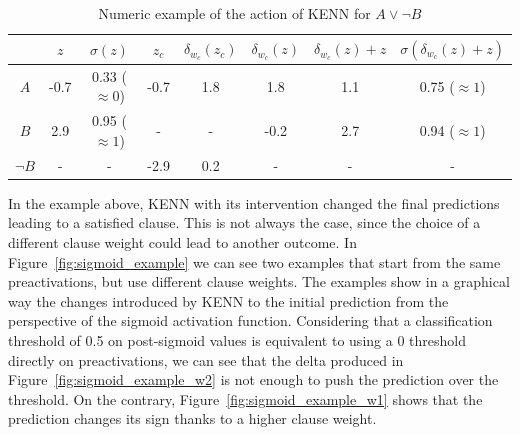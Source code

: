 \begin{table}[h]
\centering
\caption{Numeric example of the action of KENN for $ A \vee \neg B $}
\label{tab:example_tbf_values}
\begin{tabular}{c|c|c|c|c|c|c|c|}
\cline{2-8}
                                 & $ z $ & $ \sigma (z) $       & $ z_{c} $ & $ \delta _{w_{c}}(z_{c}) $ & $ \delta _{w_{c}}(z) $ & $ \delta _{w_{c}}(z) + z $ & $ \sigma (\delta _{w_{c}}(z)+ z)$ \\ \hline
\multicolumn{1}{|c|}{$ A $}      & -0.7  & 0.33 ($ \approx 0 $) & -0.7      & 1.8                        & 1.8                    & 1.1                        & 0.75 ($ \approx 1 $)              \\ \hline
\multicolumn{1}{|c|}{$ B $}      & 2.9   & 0.95 ($ \approx 1 $) & -         & -                          & -0.2                   & 2.7                        & 0.94 ($ \approx 1 $)              \\ \hline
\multicolumn{1}{|c|}{$ \neg B $} & -     & -                    & -2.9      & 0.2                        & -                      & -                          & -                                 \\ \hline
\end{tabular}
\end{table}


In the example above, KENN with its intervention changed the final predictions leading to a satisfied clause. This is not always the case, since the choice of a different clause weight could lead to another outcome. In Figure~\ref{fig:sigmoid_example} we can see two examples that start from the same preactivations, but use different clause weights. The examples show in a graphical way the changes introduced by KENN to the initial prediction from the perspective of the sigmoid activation function. Considering that a classification threshold of 0.5 on post-sigmoid values is equivalent to using a 0 threshold directly on preactivations, we can see that the delta produced in Figure~\ref{fig:sigmoid_example_w2} is not enough to push the prediction over the threshold. On the contrary, Figure~\ref{fig:sigmoid_example_w1} shows that the prediction changes its sign thanks to a higher clause weight.

